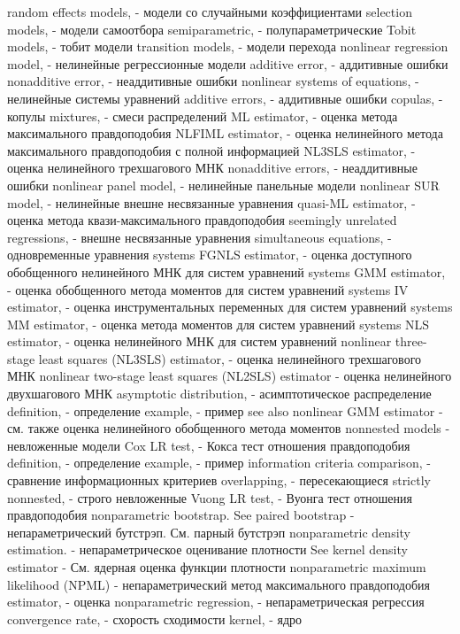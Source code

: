 random effects models, - модели со случайными коэффициентами
selection models, - модели самоотбора
semiparametric, - полупараметрические
Tobit models, - тобит модели
transition models, - модели перехода
nonlinear regression model, - нелинейные регрессионные модели
additive error, - аддитивные ошибки
nonadditive error, - неаддитивные ошибки
nonlinear systems of equations, - нелинейные системы уравнений
additive errors, - аддитивные ошибки
copulas, - копулы
mixtures, - смеси распределений
ML estimator, - оценка метода максимального правдоподобия
NLFIML estimator, - оценка нелинейного метода максимального правдоподобия с полной информацией
NL3SLS estimator, - оценка нелинейного трехшагового МНК
nonadditive errors, - неаддитивные ошибки
nonlinear panel model, - нелинейные панельные модели
nonlinear SUR model, - нелинейные внешне несвязанные уравнения
quasi-ML estimator, - оценка метода квази-максимального правдоподобия
seemingly unrelated regressions, - внешне несвязанные уравнения
simultaneous equations, - одновременные уравнения
systems FGNLS estimator,  - оценка доступного обобщенного нелинейного МНК для систем уравнений
systems GMM estimator, - оценка обобщенного метода моментов для систем уравнений
systems IV estimator, - оценка инструментальных переменных для систем уравнений
systems MM estimator, - оценка метода моментов для систем уравнений
systems NLS estimator, - оценка нелинейного МНК для систем уравнений
nonlinear three-stage least squares (NL3SLS) estimator, - оценка нелинейного трехшагового МНК
nonlinear two-stage least squares (NL2SLS) estimator - оценка нелинейного двухшагового МНК
asymptotic distribution, - асимптотическое распределение
definition, - определение
example, - пример
see also nonlinear GMM estimator  - см. также оценка нелинейного обобщенного метода моментов
nonnested models - невложенные модели
Cox LR test, - Кокса тест отношения правдоподобия
definition, - определение
example, - пример
information criteria comparison, - сравнение информационных критериев
overlapping, - пересекающиеся
strictly nonnested, - строго невложенные
Vuong LR test, - Вуонга тест отношения правдоподобия
nonparametric bootstrap. See paired bootstrap - непараметрический бутстрэп. См. парный бутстрэп
nonparametric density estimation. - непараметрическое оценивание плотности
See kernel density estimator - См. ядерная оценка функции плотности
nonparametric maximum likelihood (NPML) - непараметрический метод максимального правдоподобия
estimator, - оценка
nonparametric regression, - непараметрическая регрессия
convergence rate, - схорость сходимости
kernel, - ядро
